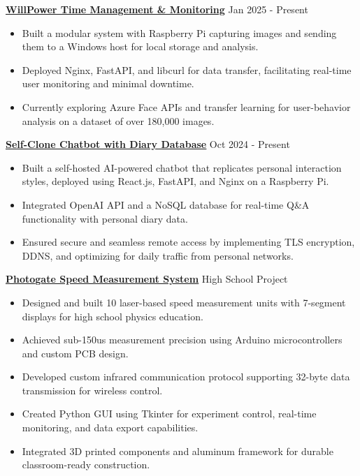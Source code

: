 \documentclass[a4paper,10pt]{article}
\begin{document}
\vspace{0.3cm}
\noindent\href{https://github.com/Ken-2511/WillPower}{\uline{
\textbf{WillPower \textbar{} Time Management \& Monitoring}}} \hfill Jan 2025 - Present
\begin{itemize}[leftmargin=0.2in]
    \item Built a modular system with Raspberry Pi capturing images and sending them to a Windows host for local storage and analysis.
    \item Deployed Nginx, FastAPI, and libcurl for data transfer, facilitating real-time user monitoring and minimal downtime.
    \item Currently exploring Azure Face APIs and transfer learning for user-behavior analysis on a dataset of over 180,000 images.
\end{itemize}

\vspace{0.3cm}
\noindent\href{https://chengyongkang.me/chat}{\uline{
\textbf{Self-Clone Chatbot with Diary Database}}} \hfill Oct 2024 - Present
\begin{itemize}[leftmargin=0.2in]
    \item Built a self-hosted AI-powered chatbot that replicates personal interaction styles, deployed using React.js, FastAPI, and Nginx on a Raspberry Pi.
    \item Integrated OpenAI API and a NoSQL database for real-time Q\&A functionality with personal diary data.
    \item Ensured secure and seamless remote access by implementing TLS encryption, DDNS, and optimizing for daily traffic from personal networks.
\end{itemize}

\vspace{0.3cm}
\noindent\href{https://github.com/Ken-2511/Photogate}{\uline{
\textbf{Photogate Speed Measurement System}}} \hfill High School Project
\begin{itemize}[leftmargin=0.2in]
    \item Designed and built 10 laser-based speed measurement units with 7-segment displays for high school physics education.
    \item Achieved sub-150us measurement precision using Arduino microcontrollers and custom PCB design.
    \item Developed custom infrared communication protocol supporting 32-byte data transmission for wireless control.
    \item Created Python GUI using Tkinter for experiment control, real-time monitoring, and data export capabilities.
    \item Integrated 3D printed components and aluminum framework for durable classroom-ready construction.
\end{itemize}
\end{document}

